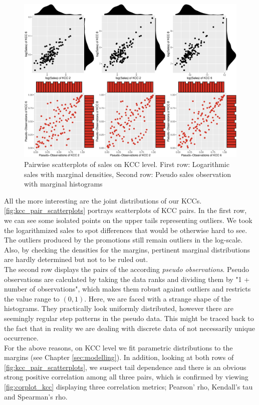 \begin{figure}[H]
\centering
  \includegraphics[width=0.95\linewidth]{figures/kcc_pair_scatterplots.eps}
  \caption{Pairwise scatterplots of sales on \ac{KCC} level. First row: Logarithmic sales with marginal densities, Second row: Pseudo sales observation with marginal histograms}
  \label{fig:kcc_pair_scatterplots}
\end{figure}


All the more interesting are the joint distributions of our \acp{KCC}. \autoref{fig:kcc_pair_scatterplots} portrays scatterplots of \ac{KCC} pairs. In the first row, we can see some isolated points on the upper tails representing outliers. We took the logarithmized sales to spot differences that would be otherwise hard to see. The outliers produced by the promotions still remain outliers in the log-scale. Also, by checking the densities for the margins, pertinent marginal distributions are hardly determined but not to be ruled out.\\
The second row displays the pairs of the according \textit{pseudo observations}. Pseudo observations are calculated by taking the data ranks and dividing them by "1 + number of observations", which makes them robust against outliers and restricts the value range to $(0, 1)$. Here, we are faced with a strange shape of the histograms. They practically look uniformly distributed, however there are seemingly regular step patterns in the pseudo data. This might be traced back to the fact that in reality we are dealing with discrete data of not necessarily unique occurrence.\\

For the above reasons, on \ac{KCC} level we fit parametric distributions to the margins (see Chapter \ref{sec:modelling}). 
In addition, looking at both rows of \autoref{fig:kcc_pair_scatterplots}, we suspect tail dependence and there is an obvious strong positive correlation among all three pairs, which is confirmed by viewing \autoref{fig:corplot_kcc} displaying three correlation metrics; Pearson' rho, Kendall's tau and Spearman's rho.
 \\


